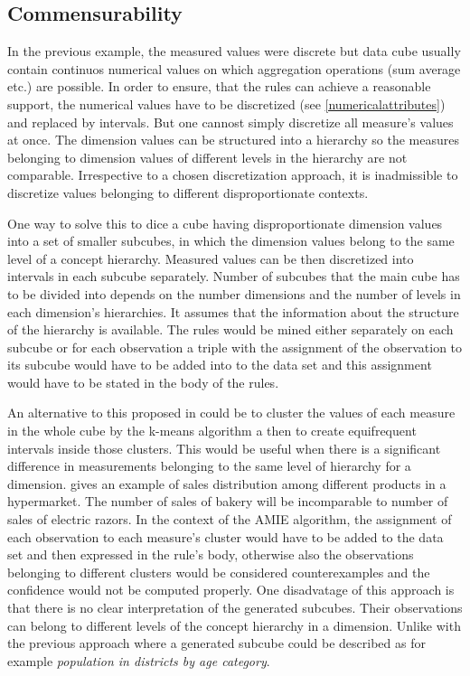 \subsection{Commensurability}

In the previous example, the measured values were discrete but data cube usually contain continuos numerical values on which aggregation operations (sum average etc.) are possible. In order to ensure, that the rules can achieve a reasonable support, the numerical values have to be discretized (see \ref{numericalattributes}) and replaced by intervals. But one cannost simply discretize all measure's values at once. The dimension values can be structured into a hierarchy so the measures belonging to dimension values of different levels in the hierarchy are not comparable.\cite{Chudan2015} Irrespective to a chosen discretization approach, it is inadmissible to discretize values belonging to different disproportionate contexts.

One way to solve this to dice a cube having disproportionate dimension values into a set of smaller subcubes, in which the dimension values belong to the same level of a concept hierarchy. Measured values can be then discretized into intervals in each subcube separately. Number of subcubes that the main cube has to be divided into depends on the number dimensions and the number of levels in each dimension’s hierarchies. It assumes that the information about the structure of the hierarchy is available. The rules would be mined either separately on each subcube or for each observation a triple with the assignment of the observation to its subcube would have to be added into to the data set and this assignment would have to be stated in the body of the rules.

An alternative to this proposed in \cite{Koukal2017} could be to cluster the values of each measure in the whole cube by the k-means algorithm a then to create equifrequent intervals inside those clusters. This would be useful when there is a significant difference in measurements belonging to the same level of hierarchy for a dimension. \cite{Koukal2017} gives an example of sales distribution among different products in a hypermarket. The number of sales of bakery will be incomparable to number of sales of electric razors. In the context of the AMIE algorithm, the assignment of each observation to each measure's cluster would have to be added to the data set and then expressed in the rule's body, otherwise also the observations belonging to different clusters would be considered counterexamples and the confidence would not be computed properly. One disadvatage of this approach is that there is no clear interpretation of the generated subcubes. Their observations can belong to different levels of the concept hierarchy in a dimension. Unlike with the previous approach where a generated subcube could be described as for example \textit{population in districts by age category}.


